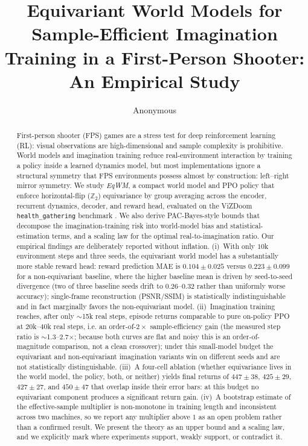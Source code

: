 \documentclass[preprint,12pt]{elsarticle}
\begin{document}
\begin{frontmatter}

\title{Equivariant World Models for Sample-Efficient Imagination\\
Training in a First-Person Shooter: An Empirical Study}

\author[1]{Anonymous}
\address[1]{Anonymous Institution (double-blind review)}

\begin{abstract}
First-person shooter (FPS) games are a stress test for deep reinforcement
learning (RL): visual observations are high-dimensional and sample
complexity is prohibitive. World models and imagination training
\cite{worldmodels2018,dreamerv3} reduce real-environment interaction by
training a policy inside a learned dynamics model, but most implementations
ignore a structural symmetry that FPS environments possess almost by
construction: left--right mirror symmetry. We study \emph{EqWM}, a compact
world model and PPO policy that enforce horizontal-flip ($\mathbb Z_2$)
equivariance by group averaging across the encoder, recurrent dynamics,
decoder, and reward head, evaluated on the ViZDoom \texttt{health\_gathering}
benchmark \cite{vizdoom2016}. We also derive PAC-Bayes-style bounds that
decompose the imagination-training risk into world-model bias and
statistical-estimation terms, and a scaling law for the optimal
real-to-imagination ratio. Our empirical findings are deliberately reported
without inflation. (i)~With only $10$k environment steps and three seeds, the
equivariant world model has a substantially more stable reward head: reward
prediction MAE is $0.104\pm0.025$ versus $0.223\pm0.099$ for a
non-equivariant baseline, where the higher baseline mean is driven by
seed-to-seed divergence (two of three baseline seeds drift to
$0.26$--$0.32$ rather than uniformly worse accuracy); single-frame
reconstruction (PSNR/SSIM) is statistically indistinguishable and in fact
marginally favors the non-equivariant model. (ii)~Imagination training
reaches, after only $\sim$15k real steps, episode returns comparable to pure
on-policy PPO at $20$k--$40$k real steps, i.e. an order-of-$2\times$
sample-efficiency gain (the measured step ratio is $\sim$1.3--2.7$\times$;
because both curves are flat and noisy this is an order-of-magnitude
comparison, not a clean crossover); under this small-model budget the
equivariant and non-equivariant imagination variants win on different seeds
and are not statistically distinguishable. (iii)~A four-cell ablation
(whether equivariance lives in the world model, the policy, both, or
neither) yields final returns of $447\pm38$, $425\pm29$, $427\pm27$, and
$450\pm47$ that overlap inside their error bars: at this budget no
equivariant component produces a significant return gain. (iv)~A bootstrap
estimate of the effective-sample multiplier is non-monotone in training
length and inconsistent across two machines, so we report any multiplier
above $1$ as an open problem rather than a confirmed result. We
present the theory as an upper bound and a scaling law, and we explicitly
mark where experiments support, weakly support, or contradict it.
\end{abstract}


\end{frontmatter}
\end{document}
